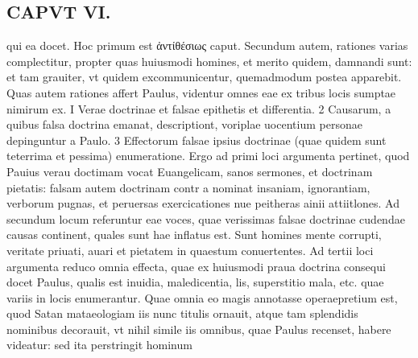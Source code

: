 \documentclass{article}
\begin{document}
\begin{pages}
\section*{CAPVT  VI. }
\marginpar{[ p.425 ]}\pstart qui ea docet. Hoc primum est ἀντίθέσιως caput. Secundum autem, rationes varias complectitur, propter quas huiusmodi homines, et merito quidem, damnandi sunt: et tam grauiter, vt quidem excommunicentur, quemadmodum postea apparebit. Quas autem rationes affert Paulus, videntur omnes eae ex tribus locis sumptae nimirum ex. I Verae doctrinae et falsae epithetis et differentia. 2 Causarum, a quibus falsa doctrina emanat, descriptiont, voriplae uocentium personae depinguntur a Paulo. 3 Effectorum falsae ipsius doctrinae (quae quidem sunt teterrima et pessima) enumeratione.  \pend\pstart Ergo ad primi loci argumenta pertinet, quod Pauius verau doctimam vocat Euangelicam, sanos sermones, et doctrinam pietatis: falsam autem doctrinam contr a nominat insaniam, ignorantiam, verborum pugnas, et peruersas exercicationes nue peitheras ainii attiitlones.  \pend\pstart Ad secundum locum referuntur eae voces, quae verissimas falsae doctrinae cudendae causas continent, quales sunt hae inflatus est. Sunt homines mente corrupti, veritate priuati, auari et pietatem in quaestum conuertentes.  \pend\pstart Ad tertii loci argumenta reduco omnia effecta, quae ex huiusmodi praua doctrina consequi docet Paulus, qualis est inuidia, maledicentia, lis, superstitio mala, etc. quae variis in locis enumerantur. Quae omnia eo magis annotasse operaepretium est, quod Satan mataeologiam iis nunc titulis ornauit, atque  tam splendidis nominibus decorauit, vt nihil simile iis omnibus, quae Paulus recenset, habere videatur: sed ita perstringit hominum  \pend

\end{pages}
\end{document}
